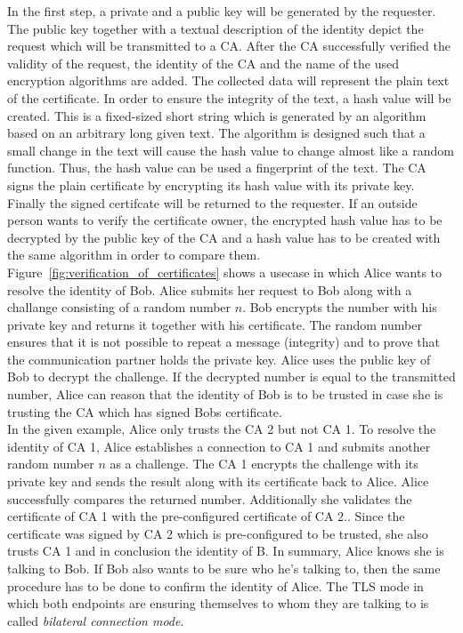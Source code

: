In the first step, a private and a public key will be generated by the requester.
The public key together with a textual description of the identity depict the request which will be transmitted to a CA.
After the CA successfully verified the validity of the request, the identity of the CA and the name of the used encryption algorithms are added.
The collected data will represent the plain text of the certificate.
In order to ensure the integrity of the text, a hash value will be created.
This is a fixed-sized short string which is generated by an algorithm based on an arbitrary long given text.
The algorithm is designed such that a small change in the text will cause the hash value to change almost like a random function.
Thus, the hash value can be used a fingerprint of the text.
The CA signs the plain certificate by encrypting its hash value with its private key.
Finally the signed certifcate will be returned to the requester.
If an outside person wants to verify the certificate owner, the encrypted hash value has to be decrypted by the public key of the CA and a hash value has to be created with the same algorithm in order to compare them.\\


Figure~\ref{fig:verification_of_certificates} shows a usecase in which Alice wants to resolve the identity of Bob.
Alice submits her request to Bob along with a challange consisting of a random number $n$. 
Bob encrypts the number with his private key and returns it together with his certificate.
The random number ensures that it is not possible to repeat a message (integrity) and to prove that the communication partner holds the private key.
Alice uses the public key of Bob to decrypt the challenge. 
If the decrypted number is equal to the transmitted number, Alice can reason that the identity of Bob is to be trusted in case she is trusting the CA which has signed Bobs certificate.\\

In the given example, Alice only trusts the CA 2 but not CA 1.
To resolve the identity of CA 1, Alice establishes a connection to CA 1 and submits another random number $n$ as a challenge.
The CA 1 encrypts the challenge with its private key and sends the result along with its certificate back to Alice. 
Alice successfully compares the returned number. Additionally she validates the certificate of CA 1 with the pre-configured certificate of CA 2..
Since the certificate was signed by CA 2 which is pre-configured to be trusted, she also trusts CA 1 and in conclusion the identity of B.
In summary, Alice knows she is talking to Bob.
If Bob also wants to be sure who he's talking to, then the same procedure has to be done to confirm the identity of Alice.
The TLS mode in which both endpoints are ensuring themselves to whom they are talking to is called \textit{bilateral connection mode}.\\


